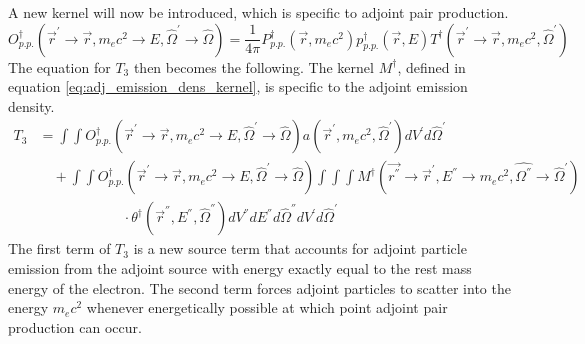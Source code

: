 A new kernel will now be introduced, which is specific to adjoint pair 
production.
\begin{equation}
  O_{p.p.}^{\dagger}(\vec{r}^{'} \to \vec{r}, m_ec^2 \to E, \hat{\Omega}^{'}
  \to \hat{\Omega}) = \frac{1}{4\pi}P_{p.p.}^{\dagger}(\vec{r},m_ec^2)
  p_{p.p.}^{\dagger}(\vec{r},E) 
  T^{\dagger}(\vec{r}^{'} \to \vec{r},m_ec^2,\hat{\Omega}^{'})
\end{equation}
The equation for $T_3$ then becomes the following. The kernel $M^{\dagger}$,
defined in equation \ref{eq:adj_emission_dens_kernel}, is specific to the 
adjoint emission density.
\begin{align}
  T_3 & = \int\int 
  O_{p.p.}^{\dagger}(\vec{r}^{'} \to \vec{r}, m_ec^2 \to E, \hat{\Omega}^{'}
  \to \hat{\Omega}) a(\vec{r}^{'},m_ec^2,\hat{\Omega}^{'}) 
  dV^{'}d\hat{\Omega}^{'} \nonumber \\
  & \quad + \int\int 
  O_{p.p.}^{\dagger}(\vec{r}^{'} \to \vec{r}, m_ec^2 \to E, \hat{\Omega}^{'}
  \to \hat{\Omega}) \int\int\int
  M^{\dagger}(\vec{r^{''}} \to \vec{r}^{'},E^{''} \to m_ec^2,\hat{\Omega^{''}} \to 
  \hat{\Omega}^{'}) \nonumber \\
  & \qquad\qquad\qquad\cdot
  \theta^{\dagger}(\vec{r}^{''},E^{''},\hat{\Omega}^{''}) 
  dV^{''}dE^{''}d\hat{\Omega}^{''}dV^{'}d\hat{\Omega}^{'}
  \label{eq:pair_production_term}
\end{align}
The first term of $T_3$ is a new source term that accounts for adjoint particle 
emission from the adjoint source with energy exactly equal to the rest mass 
energy of the electron. The second term forces adjoint particles to 
scatter into the energy $m_ec^2$ whenever energetically possible at which point
adjoint pair production can occur.

